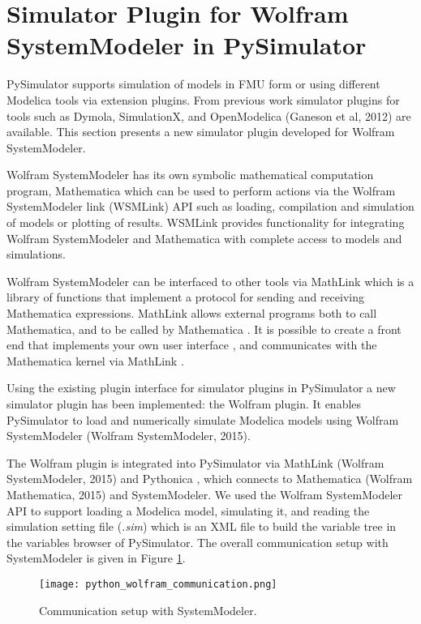 \section{Simulator Plugin for Wolfram SystemModeler in PySimulator}
\label{sec:pythonwolframplugin}

PySimulator supports simulation of models in FMU form or using different Modelica tools via extension
plugins. From previous work simulator plugins for tools such as Dymola, SimulationX, and
OpenModelica (Ganeson et al, 2012) are available. This section presents a new simulator plugin developed
for Wolfram SystemModeler.

Wolfram SystemModeler has its own symbolic mathematical computation program, Mathematica \cite{mathematica} which can be used
to perform actions via the Wolfram SystemModeler link (WSMLink)\cite{wsmlink} API such as loading, compilation and 
simulation of models or plotting of results. WSMLink provides functionality 
for integrating Wolfram SystemModeler and Mathematica  with complete access to models and simulations.

Wolfram SystemModeler can be interfaced to other tools via MathLink\cite{mathlink} which is a library of functions that 
implement a protocol for sending and receiving Mathematica expressions. MathLink\cite{mathlinktutorial,mathlink} allows external
programs both to call Mathematica, and to be called by Mathematica . It is possible to create a front end that 
implements your own user interface , and communicates with the Mathematica kernel via MathLink \cite{mathlinkc}.

Using the existing plugin interface for simulator plugins in PySimulator a new simulator plugin has
been implemented: the Wolfram plugin. It enables PySimulator to load and numerically simulate
Modelica models using Wolfram SystemModeler (Wolfram SystemModeler, 2015).

The Wolfram plugin is integrated into PySimulator via MathLink (Wolfram SystemModeler, 2015) and
Pythonica \cite{pythonica}, which connects to Mathematica (Wolfram Mathematica, 2015) and
SystemModeler. We used the Wolfram SystemModeler API to support loading a Modelica model, simulating
it, and reading the simulation setting file (\textit{.sim}) which is an XML file to build the variable tree in the
variables browser of PySimulator. The overall communication setup with SystemModeler is given in
Figure \ref{fig:pythonwolframcommunication}.

\begin{figure}
	\texttt{[image: python\_wolfram\_communication.png]}
	\caption{Communication setup with SystemModeler.}
	\label{fig:pythonwolframcommunication}
\end{figure}

